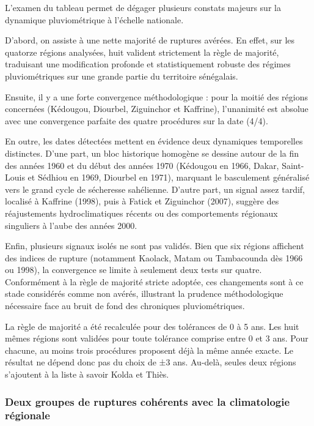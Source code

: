 \documentclass[12pt,a4paper]{report}
\begin{document}

L'examen du tableau permet de dégager plusieurs constats majeurs sur la dynamique pluviométrique à l'échelle nationale.

D’abord, on assiste à une nette majorité de ruptures avérées. En effet, sur les quatorze régions analysées, huit valident strictement la règle de majorité, traduisant une modification profonde et statistiquement robuste des régimes pluviométriques sur une grande partie du territoire sénégalais.

Ensuite, il y a une forte convergence méthodologique : pour la moitié des régions concernées (Kédougou, Diourbel, Ziguinchor et Kaffrine), l'unanimité est absolue avec une convergence parfaite des quatre procédures sur la date (4/4).

En outre, les dates détectées mettent en évidence deux dynamiques temporelles distinctes. D'une part, un bloc historique homogène se dessine autour de la fin des années 1960 et du début des années 1970 (Kédougou en 1966, Dakar, Saint-Louis et Sédhiou en 1969, Diourbel en 1971), marquant le basculement généralisé vers le grand cycle de sécheresse sahélienne. D'autre part, un signal assez tardif, localisé à Kaffrine (1998), puis à Fatick et Ziguinchor (2007), suggère des réajustements hydroclimatiques récents ou des comportements régionaux singuliers à l'aube des années 2000.

Enfin, plusieurs signaux isolés ne sont pas validés. Bien que six régions affichent des indices de rupture (notamment Kaolack, Matam ou Tambacounda dès 1966 ou 1998), la convergence se limite à seulement deux tests sur quatre. Conformément à la règle de majorité stricte adoptée, ces changements sont à ce stade considérés comme non avérés, illustrant la prudence méthodologique nécessaire face au bruit de fond des chroniques pluviométriques.

La règle de majorité a été recalculée pour des tolérances de 0 à 5 ans. Les huit mêmes régions sont validées pour toute tolérance comprise entre 0 et 3 ans. Pour chacune, au moins trois procédures proposent déjà la même année exacte. Le résultat ne dépend donc pas du choix de ±3 ans. Au-delà, seules deux régions s’ajoutent à la liste à savoir Kolda et Thiès.

\subsubsection*{Deux groupes de ruptures cohérents avec la climatologie régionale}
\end{document}
